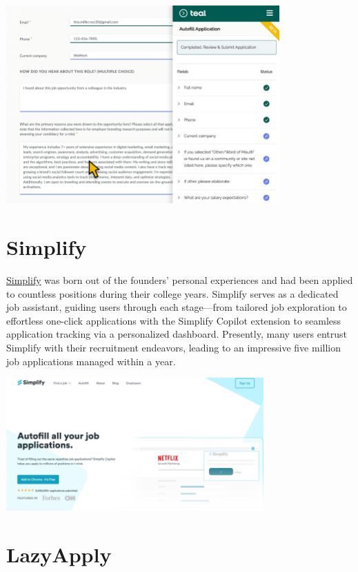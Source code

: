 \documentclass[
]{book}
\begin{document}
\includegraphics[width=4.125in,height=\textheight]{teal pic.png}

\hypertarget{simplify}{%
\section{Simplify}\label{simplify}}

\href{https://simplify.jobs/autofill\#how-it-works}{Simplify} was born out of the founders' personal experiences and had been applied to countless positions during their college years. Simplify serves as a dedicated job assistant, guiding users through each stage---from tailored job exploration to effortless one-click applications with the Simplify Copilot extension to seamless application tracking via a personalized dashboard. Presently, many users entrust Simplify with their recruitment endeavors, leading to an impressive five million job applications managed within a year.~

\includegraphics[width=3.88542in,height=\textheight]{simplify pic.png}

\hypertarget{lazyapply-1}{%
\section{LazyApply}\label{lazyapply-1}}
\end{document}
